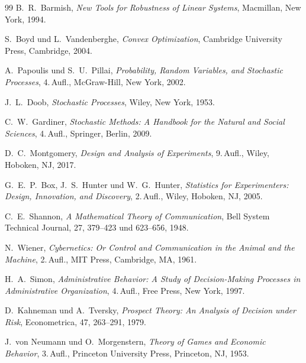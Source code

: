\documentclass[a4paper, 12pt, twoside, openright]{report}
\theoremstyle{definition}
\theoremstyle{definition}
\begin{document}
\begin{thebibliography}{99}
	B.~R.~Barmish,
	\textit{New Tools for Robustness of Linear Systems},
	Macmillan, New York, 1994.

	S.~Boyd und L.~Vandenberghe,
	\textit{Convex Optimization},
	Cambridge University Press, Cambridge, 2004.

	A.~Papoulis und S.~U.~Pillai,
	\textit{Probability, Random Variables, and Stochastic Processes},
	4.\,Aufl., McGraw-Hill, New York, 2002.

	J.~L.~Doob,
	\textit{Stochastic Processes},
	Wiley, New York, 1953.

	C.~W.~Gardiner,
	\textit{Stochastic Methods: A Handbook for the Natural and Social Sciences},
	4.\,Aufl., Springer, Berlin, 2009.

	D.~C.~Montgomery,
	\textit{Design and Analysis of Experiments},
	9.\,Aufl., Wiley, Hoboken, NJ, 2017.

	G.~E.~P.~Box, J.~S.~Hunter und W.~G.~Hunter,
	\textit{Statistics for Experimenters: Design, Innovation, and Discovery},
	2.\,Aufl., Wiley, Hoboken, NJ, 2005.

	C.~E.~Shannon,
	\textit{A Mathematical Theory of Communication},
	Bell System Technical Journal, 27, 379--423 und 623--656, 1948.

	N.~Wiener,
	\textit{Cybernetics: Or Control and Communication in the Animal and the Machine},
	2.\,Aufl., MIT Press, Cambridge, MA, 1961.

	H.~A.~Simon,
	\textit{Administrative Behavior: A Study of Decision-Making Processes in Administrative Organization},
	4.\,Aufl., Free Press, New York, 1997.

	D.~Kahneman und A.~Tversky,
	\textit{Prospect Theory: An Analysis of Decision under Risk},
	Econometrica, 47, 263--291, 1979.

	J.~von Neumann und O.~Morgenstern,
	\textit{Theory of Games and Economic Behavior},
	3.\,Aufl., Princeton University Press, Princeton, NJ, 1953.


\end{thebibliography}
\end{document}
